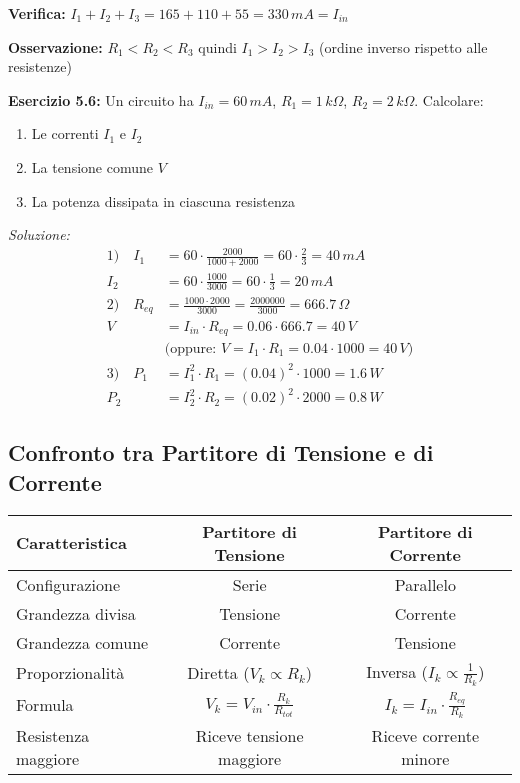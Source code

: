 \documentclass[a4paper,12pt]{article}
\begin{document}
\textbf{Verifica:} $I_1 + I_2 + I_3 = 165 + 110 + 55 = 330\,mA = I_{in}$ \checkmark

\textbf{Osservazione:} $R_1 < R_2 < R_3$ quindi $I_1 > I_2 > I_3$ (ordine inverso rispetto alle resistenze)

\textbf{Esercizio 5.6:} Un circuito ha $I_{in} = 60\,mA$, $R_1 = 1\,k\Omega$, $R_2 = 2\,k\Omega$. Calcolare:
\begin{enumerate}
    \item Le correnti $I_1$ e $I_2$
    \item La tensione comune $V$
    \item La potenza dissipata in ciascuna resistenza
\end{enumerate}

\textit{Soluzione:}
\begin{align*}
1)\quad I_1 &= 60 \cdot \frac{2000}{1000 + 2000} = 60 \cdot \frac{2}{3} = 40\,mA \\
I_2 &= 60 \cdot \frac{1000}{3000} = 60 \cdot \frac{1}{3} = 20\,mA \\
2)\quad R_{eq} &= \frac{1000 \cdot 2000}{3000} = \frac{2000000}{3000} = 666.7\,\Omega \\
V &= I_{in} \cdot R_{eq} = 0.06 \cdot 666.7 = 40\,V \\
&\text{(oppure: } V = I_1 \cdot R_1 = 0.04 \cdot 1000 = 40\,V \text{)} \\
3)\quad P_1 &= I_1^2 \cdot R_1 = (0.04)^2 \cdot 1000 = 1.6\,W \\
P_2 &= I_2^2 \cdot R_2 = (0.02)^2 \cdot 2000 = 0.8\,W
\end{align*}

\subsection{Confronto tra Partitore di Tensione e di Corrente}

\begin{center}
\begin{tabular}{|l|c|c|}
\hline
\textbf{Caratteristica} & \textbf{Partitore di Tensione} & \textbf{Partitore di Corrente} \\
\hline
Configurazione & Serie & Parallelo \\
\hline
Grandezza divisa & Tensione & Corrente \\
\hline
Grandezza comune & Corrente & Tensione \\
\hline
Proporzionalità & Diretta ($V_k \propto R_k$) & Inversa ($I_k \propto \frac{1}{R_k}$) \\
\hline
Formula & $V_k = V_{in} \cdot \frac{R_k}{R_{tot}}$ & $I_k = I_{in} \cdot \frac{R_{eq}}{R_k}$ \\
\hline
Resistenza maggiore & Riceve tensione maggiore & Riceve corrente minore \\
\hline
\end{tabular}
\end{center}
\end{document}
